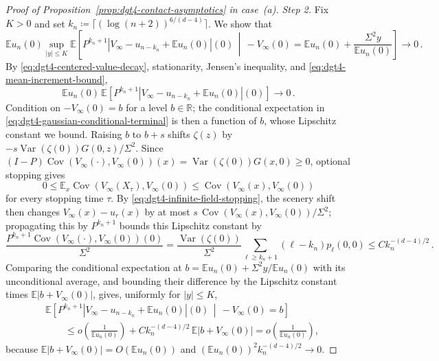 \documentclass[11pt]{amsart}
\theoremstyle{plain}
\theoremstyle{definition}
\newcommand{\R}{\mathbb{R}}
\newcommand{\E}{\mathbb{E}}
\DeclareMathOperator{\Var}{Var}
\DeclareMathOperator{\Cov}{Cov}
\begin{document}
\begin{proof}[Proof of Proposition~\ref{prop:dgt4-contact-asymptotics} in case~\textup{(a)}]
	\noindent\emph{Step 2.} Fix $K>0$ and set
	$k_n\coloneqq\lceil(\log(n+2))^{6/(d-4)}\rceil$. We show that
	\begin{equation}\label{eq:dgt4-gaussian-conditional-terminal}
		\E u_n(0)\sup_{|y|\leq K}
		\E\left[
		P^{k_n+1}|V_\infty-u_{n-k_n}+\E u_n(0)|(0)
		\,\middle|\,
		-V_\infty(0)=\E u_n(0)+\frac{\Sigma^2y}{\E u_n(0)}
		\right]\longrightarrow0\, .
	\end{equation}
	By \eqref{eq:dgt4-centered-value-decay}, stationarity, Jensen's inequality, and
	\eqref{eq:dgt4-mean-increment-bound},
	\[
		\E u_n(0)\,
		\E\left[P^{k_n+1}|V_\infty-u_{n-k_n}+\E u_n(0)|(0)\right]
		\longrightarrow0\, .
	\]
	Condition on $-V_\infty(0)=b$ for a level $b\in\R$; the conditional expectation in
	\eqref{eq:dgt4-gaussian-conditional-terminal} is then a function of $b$, whose Lipschitz
	constant we bound. Raising $b$ to $b+s$ shifts $\zeta(z)$ by
	$-s\Var(\zeta(0))G(0,z)/\Sigma^2$. Since
	$(I-P)\Cov(V_\infty(\mathord\cdot),V_\infty(0))(x)
	=\Var(\zeta(0))G(x,0)\geq0$, optional stopping gives
	\begin{equation}\label{eq:dgt4-gaussian-covariance-sampling}
		0\leq
		\E_x\Cov(V_\infty(X_\tau),V_\infty(0))
		\leq\Cov(V_\infty(x),V_\infty(0))
	\end{equation}
	for every stopping time $\tau$. By \eqref{eq:dgt4-infinite-field-stopping}, the
	scenery shift then changes $V_\infty(x)-u_r(x)$ by at most
	$s\,\Cov(V_\infty(x),V_\infty(0))/\Sigma^2$; propagating this by $P^{k_n+1}$ bounds
	this Lipschitz constant by
	\[
		\frac{P^{k_n+1}\Cov(V_\infty(\mathord\cdot),V_\infty(0))(0)}
		{\Sigma^2}
		=
		\frac{\Var(\zeta(0))}{\Sigma^2}
		\sum_{\ell\geq k_n+1}(\ell-k_n)p_\ell(0,0)
		\leq Ck_n^{-(d-4)/2}\, .
	\]
	Comparing the conditional expectation at
	$b=\E u_n(0)+\Sigma^2y/\E u_n(0)$ with its unconditional average, and bounding their
	difference by the Lipschitz constant times $\E|b+V_\infty(0)|$, gives, uniformly for
	$|y|\leq K$,
	\[
	\begin{aligned}
		&\E\left[P^{k_n+1}|V_\infty-u_{n-k_n}+\E u_n(0)|(0)\,\middle|\,-V_\infty(0)=b\right]\\
		&\qquad\leq o\left(\frac1{\E u_n(0)}\right)+Ck_n^{-(d-4)/2}\,\E|b+V_\infty(0)|=o\left(\frac1{\E u_n(0)}\right),
	\end{aligned}
	\]
	because $\E|b+V_\infty(0)|=O(\E u_n(0))$ and $(\E u_n(0))^2k_n^{-(d-4)/2}\to0$.


\end{proof}
\end{document}
